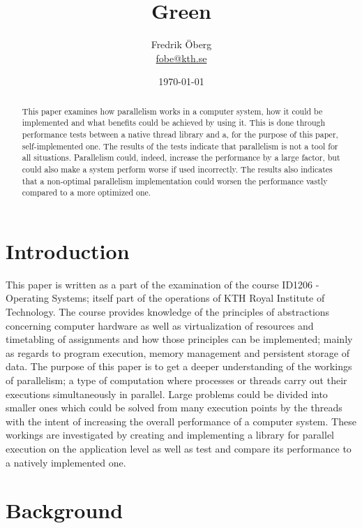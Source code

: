 \documentclass{article}
\begin{document}
\title{Green}
\author{Fredrik Öberg \\ \href{mailto:fobe@kth.se}{fobe@kth.se}}
\date{\today}
\maketitle

\begin{abstract}
This paper examines how parallelism works in a computer system, how it could be implemented and what benefits could be achieved by using it. This is done through performance tests between a native thread library and a, for the purpose of this paper, self-implemented one. The results of the tests indicate that parallelism is not a tool for all situations. Parallelism could, indeed, increase the performance by a large factor, but could also make a system perform worse if used incorrectly. The results also indicates that a non-optimal parallelism implementation could worsen the performance vastly compared to a more optimized one.
\end{abstract}

\newpage
\tableofcontents
\newpage

\section{Introduction}
This paper is written as a part of the examination of the course ID1206 - Operating Systems; itself part of the operations of KTH Royal Institute of Technology. The course provides knowledge of the principles of abstractions concerning computer hardware as well as virtualization of resources and timetabling of assignments and how those principles can be implemented; mainly as regards to program execution, memory management and persistent storage of data. 
The purpose of this paper is to get a deeper understanding of the workings of parallelism; a type of computation where processes or threads carry out their executions simultaneously in parallel. Large problems could be divided into smaller ones which could be solved from many execution points by the threads with the intent of increasing the overall performance of a computer system. These workings are investigated by creating and implementing a library for parallel execution on the application level as well as test and compare its performance to a natively implemented one. 

\section{Background}\label{background}
\end{document}
